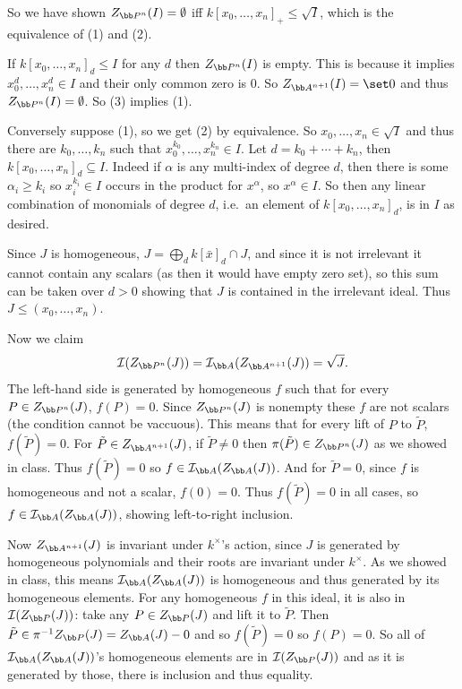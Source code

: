     So we have shown $Z_{\bP^n}(I)=\emptyset$ iff $k[x_0,\dots,x_n]_+\leq\sqrt I$, which is the equivalence of (1) and (2).

    If $k[x_0,\dots,x_n]_d\leq I$ for any $d$ then $Z_{\bP^n}(I)$ is empty.
    This is because it implies $x_0^d,\dots,x_n^d\in I$ and their only common zero is $0$.
    So $Z_{\bA^{n+1}}(I)=\set0$ and thus $Z_{\bP^n}(I)=\emptyset$.
    So (3) implies (1).

    Conversely suppose (1), so we get (2) by equivalence.
    So $x_0,\dots,x_n\in\sqrt I$ and thus there are $k_0,\dots,k_n$ such that $x_0^{k_0},\dots,x_n^{k_n}\in I$.
    Let $d=k_0+\cdots+k_n$, then $k[x_0,\dots,x_n]_d\subseteq I$.
    Indeed if $\alpha$ is any multi-index of degree $d$, then there is some $\alpha_i\geq k_i$ so $x_i^{k_i}\in I$ occurs in the product
    for $x^\alpha$, so $x^\alpha\in I$.
    So then any linear combination of monomials of degree $d$, i.e.\ an element of $k[x_0,\dots,x_n]_d$, is in $I$ as desired.

    \item Since $J$ is homogeneous, $J=\bigoplus_d k[\bar x]_d\cap J$, and since it is not irrelevant it cannot contain any scalars (as then
    it would have empty zero set), so this sum can be taken over $d>0$ showing that $J$ is contained in the irrelevant ideal.
    Thus $J\leq(x_0,\dots,x_n)$. 

    Now we claim
    $$ \I(Z_{\bP^n}(J)) = \I_\bA(Z_{\bA^{n+1}}(J)) = \sqrt J . $$
    The left-hand side is generated by homogeneous $f$ such that for every $P\in Z_{\bP^n}(J)$, $f(P)=0$.
    Since $Z_{\bP^n}(J)$ is nonempty these $f$ are not scalars (the condition cannot be vaccuous).
    This means that for every lift of $P$ to $\tilde P$, $f(\tilde P)=0$.
    For $\tilde P\in Z_{\bA^{n+1}}(J)$, if $\tilde P\neq0$ then $\pi(\tilde P)\in Z_{\bP^n}(J)$ as we showed in class.
    Thus $f(\tilde P)=0$ so $f\in\I_\bA(Z_\bA(J))$.
    And for $\tilde P=0$, since $f$ is homogeneous and not a scalar, $f(0)=0$.
    Thus $f(\tilde P)=0$ in all cases, so $f\in\I_\bA(Z_\bA(J))$, showing left-to-right inclusion.

    Now $Z_{\bA^{n+1}}(J)$ is invariant under $k^\times$'s action, since $J$ is generated by homogeneous polynomials and their roots
    are invariant under $k^\times$.
    As we showed in class, this means $\I_\bA(Z_\bA(J))$ is homogeneous and thus generated by its homogeneous elements.
    For any homogeneous $f$ in this ideal, it is also in $\I(Z_\bP(J))$: take any $P\in Z_\bP(J)$ and lift it to $\tilde P$.
    Then $\tilde P\in\pi^{-1}Z_\bP(J)=Z_\bA(J)-0$ and so $f(\tilde P)=0$ so $f(P)=0$.
    So all of $\I_\bA(Z_\bA(J))$'s homogeneous elements are in $\I(Z_\bP(J))$ and as it is generated by those, there is inclusion and thus
    equality.


